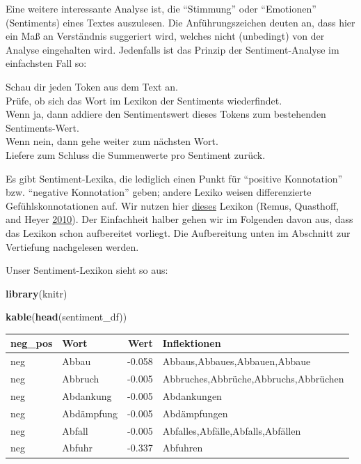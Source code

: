 \documentclass[12pt,]{book}
\newenvironment{Shaded}{\begin{snugshade}}{\end{snugshade}}
\newcommand{\KeywordTok}[1]{\textcolor[rgb]{0.13,0.29,0.53}{\textbf{{#1}}}}
\newcommand{\NormalTok}[1]{{#1}}
\let\BeginKnitrBlock\begin \let\EndKnitrBlock\end
\begin{document}
Eine weitere interessante Analyse ist, die ``Stimmung'' oder
``Emotionen'' (Sentiments) eines Textes auszulesen. Die
Anführungszeichen deuten an, dass hier ein Maß an Verständnis suggeriert
wird, welches nicht (unbedingt) von der Analyse eingehalten wird.
Jedenfalls ist das Prinzip der Sentiment-Analyse im einfachsten Fall so:

\BeginKnitrBlock{rmdpseudocode}
Schau dir jeden Token aus dem Text an.\\
Prüfe, ob sich das Wort im Lexikon der Sentiments wiederfindet.\\
Wenn ja, dann addiere den Sentimentswert dieses Tokens zum bestehenden
Sentiments-Wert.\\
Wenn nein, dann gehe weiter zum nächsten Wort.\\
Liefere zum Schluss die Summenwerte pro Sentiment zurück.
\EndKnitrBlock{rmdpseudocode}

Es gibt Sentiment-Lexika, die lediglich einen Punkt für ``positive
Konnotation'' bzw. ``negative Konnotation'' geben; andere Lexiko weisen
differenzierte Gefühlskonnotationen auf. Wir nutzen hier
\href{http://asv.informatik.uni-leipzig.de/download/sentiws.html}{dieses}
Lexikon (Remus, Quasthoff, and Heyer
\protect\hyperlink{ref-remquahey2010}{2010}). Der Einfachheit halber
gehen wir im Folgenden davon aus, dass das Lexikon schon aufbereitet
vorliegt. Die Aufbereitung unten im Abschnitt zur Vertiefung nachgelesen
werden.

Unser Sentiment-Lexikon sieht so aus:

\begin{Shaded}
\begin{Highlighting}[]
\KeywordTok{library}\NormalTok{(knitr)}

\KeywordTok{kable}\NormalTok{(}\KeywordTok{head}\NormalTok{(sentiment_df))}
\end{Highlighting}
\end{Shaded}

\begin{tabular}{l|l|r|l}
\hline
neg\_pos & Wort & Wert & Inflektionen\\
\hline
neg & Abbau & -0.058 & Abbaus,Abbaues,Abbauen,Abbaue\\
\hline
neg & Abbruch & -0.005 & Abbruches,Abbrüche,Abbruchs,Abbrüchen\\
\hline
neg & Abdankung & -0.005 & Abdankungen\\
\hline
neg & Abdämpfung & -0.005 & Abdämpfungen\\
\hline
neg & Abfall & -0.005 & Abfalles,Abfälle,Abfalls,Abfällen\\
\hline
neg & Abfuhr & -0.337 & Abfuhren\\
\hline
\end{tabular}
\end{document}
